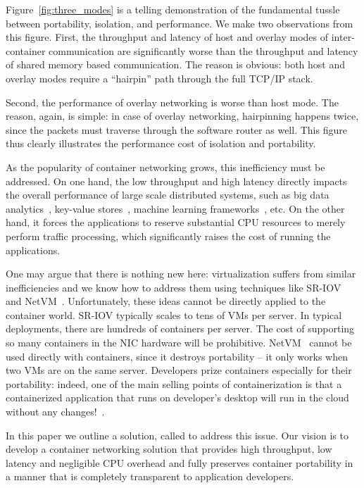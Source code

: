 Figure~\ref{fig:three_modes} is a telling demonstration of the fundamental
tussle between portability, isolation, and performance. We make two observations
from this figure. First, the throughput and latency of host and overlay modes of
inter-container communication are significantly worse than the throughput and
latency of shared memory based communication. The reason is obvious: both host
and overlay modes require a ``hairpin'' path through the full TCP/IP stack. 

Second, the performance of overlay networking is worse than host mode. The
reason, again, is simple: in case of overlay networking, hairpinning happens
twice, since the packets must traverse through the software router as well. This
figure thus clearly illustrates the performance cost of isolation and
portability.

As the popularity of container networking grows, this inefficiency must be
addressed. On one hand, the low throughput and high latency directly impacts the
overall performance of large scale distributed systems, such as big data
analytics~\cite{varys,orchestra,reining,chowdhury}, key-value
stores~\cite{farm}, machine learning frameworks~\cite{li2014communication}, etc. On the other hand,
it forces the applications to reserve substantial CPU resources to merely
perform traffic processing, which significantly raises the cost of running the
applications.

One may argue that there is nothing new here: virtualization suffers from
similar inefficiencies and we know how to address them using techniques like
SR-IOV~\cite{sriov} and NetVM~\cite{netvm}. Unfortunately, these ideas cannot be
directly applied to the container world. SR-IOV typically scales to tens of VMs
per server. In typical deployments, there are hundreds of containers per server.
The cost of supporting so many containers in the NIC hardware will be
prohibitive. NetVM~\cite{netvm} cannot be used directly with containers, since
it destroys portability -- it only works when two VMs are on the same server.
Developers prize containers especially for their portability: indeed, one of the
main selling points of containerization is that a containerized application that
runs on developer's desktop will run in the cloud without any
changes!~\cite{docker-marketing-brag}. 

In this paper we outline a solution, called \sysname to address this issue. Our vision
is to develop a container networking solution that provides high throughput,
low latency and negligible CPU overhead and fully preserves container portability in
a manner that is completely transparent to application developers. 

